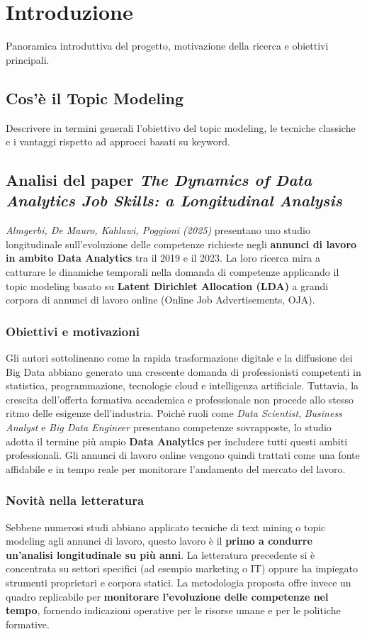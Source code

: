 \chapter{Introduzione}
Panoramica introduttiva del progetto, motivazione della ricerca e obiettivi principali.

\section{Cos'è il Topic Modeling}
Descrivere in termini generali l'obiettivo del topic modeling, le tecniche classiche e i vantaggi rispetto ad approcci basati su keyword.

\section{Analisi del paper \emph{The Dynamics of Data Analytics Job Skills: a Longitudinal Analysis}}

\textit{Almgerbi, De Mauro, Kahlawi, Poggioni (2025)} presentano uno studio longitudinale sull'evoluzione delle competenze richieste negli \textbf{annunci di lavoro in ambito Data Analytics} tra il 2019 e il 2023. 
La loro ricerca mira a catturare le dinamiche temporali nella domanda di competenze applicando il topic modeling basato su \textbf{Latent Dirichlet Allocation (LDA)} a grandi corpora di annunci di lavoro online (Online Job Advertisements, OJA).

\subsection{Obiettivi e motivazioni}
Gli autori sottolineano come la rapida trasformazione digitale e la diffusione dei Big Data abbiano generato una crescente domanda di professionisti competenti in statistica, programmazione, tecnologie cloud e intelligenza artificiale.
Tuttavia, la crescita dell'offerta formativa accademica e professionale non procede allo stesso ritmo delle esigenze dell'industria.
Poiché ruoli come \textit{Data Scientist}, \textit{Business Analyst} e \textit{Big Data Engineer} presentano competenze sovrapposte, lo studio adotta il termine più ampio \textbf{Data Analytics} per includere tutti questi ambiti professionali.
Gli annunci di lavoro online vengono quindi trattati come una fonte affidabile e in tempo reale per monitorare l'andamento del mercato del lavoro.

\subsection{Novità nella letteratura}
Sebbene numerosi studi abbiano applicato tecniche di text mining o topic modeling agli annunci di lavoro, questo lavoro è il \textbf{primo a condurre un'analisi longitudinale su più anni}.
La letteratura precedente si è concentrata su settori specifici (ad esempio marketing o IT) oppure ha impiegato strumenti proprietari e corpora statici.
La metodologia proposta offre invece un quadro replicabile per \textbf{monitorare l'evoluzione delle competenze nel tempo}, fornendo indicazioni operative per le risorse umane e per le politiche formative.


